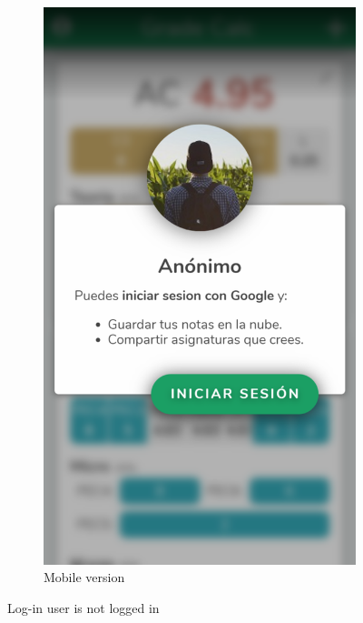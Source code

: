 \begin{figure}[ht!]
\begin{subfigure}[b]{0.243\textwidth-0.1cm}
        \includegraphics[width=\textwidth]{media/screenshots/screenshot-login.png}
        \caption{Mobile version}
    \end{subfigure}
    \caption{Log-in user is not logged in}
    \label{fig:login}
\end{figure}
\vfill

\clearpage\newpage

